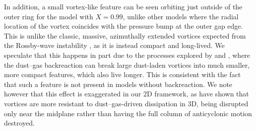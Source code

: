 \documentclass[fleqn,usenatbib,useAMS]{mnras}
\begin{document}
In addition, a small vortex-like feature can be seen orbiting just outside of the outer ring for the model with $X=0.99$, unlike other models where the radial location of the vortex coincides with the pressure bump at the outer gap edge. This is unlike the classic, massive, azimuthally extended vortices expected from the Rossby-wave instability \citep{lovelace-1999}, as it is instead compact and long-lived. We speculate that this happens in part due to the processes explored by \citet{raettig-etal-2015} and \citet{lovascio-etal-2022}, where the dust--gas backreaction can break large dust-laden vortices into much smaller, more compact features, which also live longer. This is consistent with the fact that such a feature is not present in models without backreaction. We note however that this effect is exaggerated in our 2D framework, as \citet{lyra-etal-2018} have shown that vortices are more resistant to dust--gas-driven dissipation in 3D, being disrupted only near the midplane rather than having the full column of anticyclonic motion destroyed.
\end{document}
